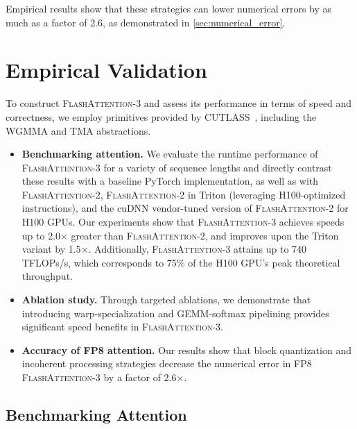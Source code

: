 \begin{algorithm}[H]
\begin{algorithmic}[1]
Empirical results show that these strategies can lower numerical errors by as much as a factor of 2.6, as demonstrated in \cref{sec:numerical_error}.

\section{Empirical Validation}
\label{sec:exp}

To construct \textsc{FlashAttention-3} and assess its performance in terms of speed and correctness, we employ primitives provided by CUTLASS~\citep{Thakkar_CUTLASS_2023}, including the WGMMA and TMA abstractions.

\begin{itemize}

\item \textbf{Benchmarking attention.} We evaluate the runtime performance of \textsc{FlashAttention-3} for a variety of sequence lengths and directly contrast these results with a baseline PyTorch implementation, as well as with \textsc{FlashAttention-2}, \textsc{FlashAttention-2} in Triton (leveraging H100-optimized instructions), and the cuDNN vendor-tuned version of \textsc{FlashAttention-2} for H100 GPUs. Our experiments show that \textsc{FlashAttention-3} achieves speeds up to 2.0$\times$ greater than \textsc{FlashAttention-2}, and improves upon the Triton variant by 1.5$\times$. Additionally, \textsc{FlashAttention-3} attains up to 740 TFLOPs/s, which corresponds to 75\% of the H100 GPU’s peak theoretical throughput.
\item \textbf{Ablation study.} Through targeted ablations, we demonstrate that introducing warp-specialization and GEMM-softmax pipelining provides significant speed benefits in \textsc{FlashAttention-3}.
\item \textbf{Accuracy of FP8 attention.} Our results show that block quantization and incoherent processing strategies decrease the numerical error in FP8 \textsc{FlashAttention-3} by a factor of 2.6$\times$.
\end{itemize}

\subsection{Benchmarking Attention}
\label{subsec:benchmark_attn}


\end{algorithmic}
\end{algorithm}
